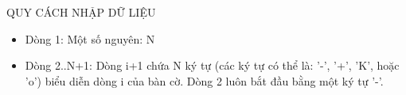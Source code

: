 QUY CÁCH NHẬP DỮ LIỆU  
\begin{itemize}
	\item     Dòng 1: Một số nguyên: N   
	\item     Dòng 2..N+1: Dòng i+1 chứa N ký tự (các ký tự có thể là: '-', '+',         'K', hoặc 'o') biểu diễn dòng i của bàn cờ. Dòng 2 luôn          bắt đầu bằng một ký tự '-'.   
\end{itemize}